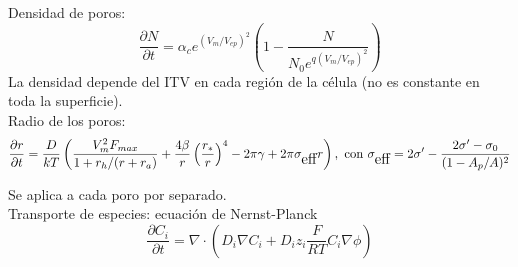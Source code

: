\documentclass[a0,portrait]{a0poster}
\begin{document}
\begin{multicols}{2}

	Densidad de poros:
	\begin{equation}
		\frac{\partial N}{\partial t} = \alpha_c e^{(V_m/V_{ep})^2} 
			\left( 1 - \frac{N}{N_0 e^{q \left(V_m/V_{ep} \right) ^2}} \right)
	\end{equation}
	La densidad depende del ITV en cada región de la célula 
	(no es constante en toda la superficie).\\


	Radio de los poros:
	\begin{equation}
		\frac{\partial r}{\partial t} = \frac{D}{kT} \left( \frac{V_m^2 F_{max}}
			{1+r_h / (r+r_a)} + \frac{4 \beta}{r} \left(\frac{r_*}{r}\right)^4 
			- 2 \pi \gamma + 2 \pi \sigma_{\textrm{\tiny eff}} r\right),			
		\textrm{ con }\sigma_{\textrm{\tiny eff}} = 2 \sigma^\prime - 
			\frac{2 \sigma^\prime - \sigma_0}{(1 - A_p / A)^2}
	\end{equation}
	
	


	Se aplica a cada poro por separado.\\


	Transporte de especies: ecuación de Nernst-Planck
	\begin{equation}
		\frac{\partial C_i}{\partial t} = \nabla \cdot \left( D_i \nabla C_i + D_i z_i 
			\frac{F}{R T} C_i \nabla \phi \right)
	\end{equation}	\\			


\end{multicols}
\end{document}
